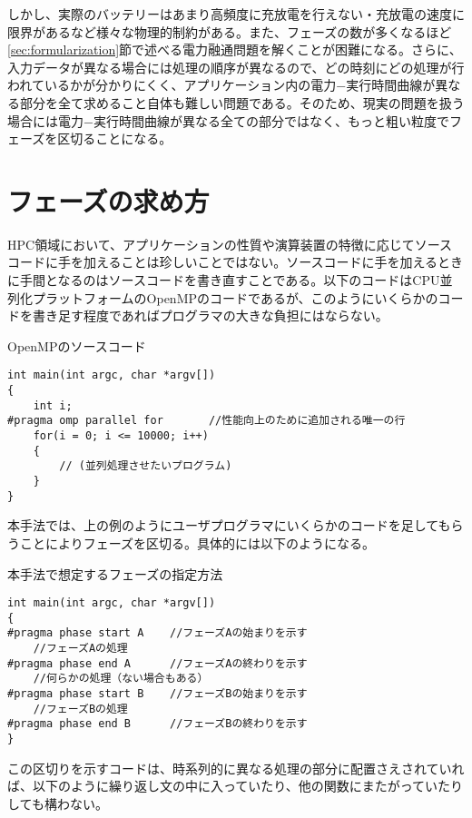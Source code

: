 しかし、実際のバッテリーはあまり高頻度に充放電を行えない・充放電の速度に限界があるなど様々な物理的制約がある。また、フェーズの数が多くなるほど\ref{sec:formularization}節で述べる電力融通問題を解くことが困難になる。さらに、入力データが異なる場合には処理の順序が異なるので、どの時刻にどの処理が行われているかが分かりにくく、アプリケーション内の電力−実行時間曲線が異なる部分を全て求めること自体も難しい問題である。そのため、現実の問題を扱う場合には電力−実行時間曲線が異なる全ての部分ではなく、もっと粗い粒度でフェーズを区切ることになる。

\section{フェーズの求め方}
\label{sec:phase2}

HPC領域において、アプリケーションの性質や演算装置の特徴に応じてソースコードに手を加えることは珍しいことではない。ソースコードに手を加えるときに手間となるのはソースコードを書き直すことである。以下のコードはCPU並列化プラットフォームのOpenMPのコードであるが、このようにいくらかのコードを書き足す程度であればプログラマの大きな負担にはならない。

{\small
\begin{itembox}[c]{OpenMPのソースコード}
\begin{verbatim}
int main(int argc, char *argv[])
{
    int i;
#pragma omp parallel for       //性能向上のために追加される唯一の行
    for(i = 0; i <= 10000; i++)
    {
        // (並列処理させたいプログラム)
    }
}
\end{verbatim}
\end{itembox}}

本手法では、上の例のようにユーザプログラマにいくらかのコードを足してもらうことによりフェーズを区切る。具体的には以下のようになる。

{\small
\begin{itembox}[c]{本手法で想定するフェーズの指定方法}
\begin{verbatim}
int main(int argc, char *argv[])
{
#pragma phase start A    //フェーズAの始まりを示す
    //フェーズAの処理
#pragma phase end A      //フェーズAの終わりを示す
    //何らかの処理（ない場合もある）
#pragma phase start B    //フェーズBの始まりを示す
    //フェーズBの処理
#pragma phase end B      //フェーズBの終わりを示す
}
\end{verbatim}
\end{itembox}}

この区切りを示すコードは、時系列的に異なる処理の部分に配置さえされていれば、以下のように繰り返し文の中に入っていたり、他の関数にまたがっていたりしても構わない。

